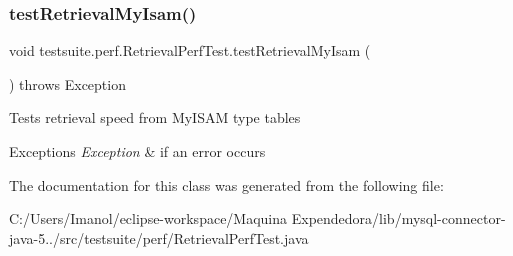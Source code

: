 \subsubsection{\texorpdfstring{test\+Retrieval\+My\+Isam()}{testRetrievalMyIsam()}}
{\footnotesize\ttfamily void testsuite.\+perf.\+Retrieval\+Perf\+Test.\+test\+Retrieval\+My\+Isam (\begin{DoxyParamCaption}{ }\end{DoxyParamCaption}) throws Exception}

Tests retrieval speed from My\+I\+S\+AM type tables


\begin{DoxyExceptions}{Exceptions}
{\em Exception} & if an error occurs \\
\hline
\end{DoxyExceptions}


The documentation for this class was generated from the following file\+:\begin{DoxyCompactItemize}
\item 
C\+:/\+Users/\+Imanol/eclipse-\/workspace/\+Maquina Expendedora/lib/mysql-\/connector-\/java-\/5../src/testsuite/perf/Retrieval\+Perf\+Test.\+java\end{DoxyCompactItemize}
